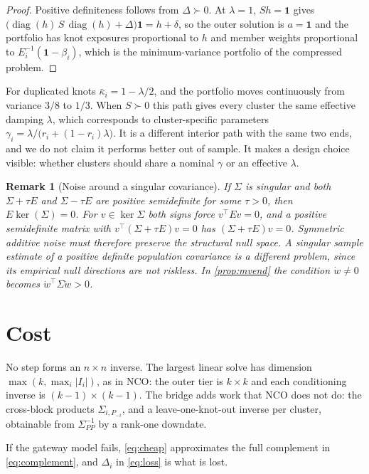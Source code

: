 \documentclass[11pt]{article}
\newcommand{\ones}{\mathbf{1}}
\newtheorem{remark}{Remark}
\begin{document}
\begin{proof}
Positive definiteness follows from $\Delta\succ0$. At $\lambda=1$,
$Sh=\ones$ gives
$\big(\operatorname{diag}(h)\,S\,\operatorname{diag}(h)+\Delta\big)\ones=h+\delta$,
so the outer solution is $a=\ones$ and the portfolio has knot exposures
proportional to $h$ and member weights proportional to $E_i^{-1}(\ones-\beta_i)$,
which is the minimum-variance portfolio of the compressed problem.
\end{proof}

For duplicated knots $\bar\kappa_i=1-\lambda/2$, and the portfolio moves
continuously from variance $3/8$ to $1/3$. When $S\succ0$ this path gives
every cluster the same effective damping $\lambda$, which corresponds to
cluster-specific parameters $\gamma_i=\lambda/\big(r_i+(1-r_i)\lambda\big)$.
It is a different interior path with the same two ends, and we do not claim
it performs better out of sample. It makes a design choice visible: whether
clusters should share a nominal $\gamma$ or an effective $\lambda$.

\begin{remark}[Noise around a singular covariance]
If $\Sigma$ is singular and both $\Sigma+\tau E$ and $\Sigma-\tau E$ are
positive semidefinite for some $\tau>0$, then $E\ker(\Sigma)=0$. For
$v\in\ker\Sigma$ both signs force $v^\top Ev=0$, and a positive semidefinite
matrix with $v^\top(\Sigma+\tau E)v=0$ has $(\Sigma+\tau E)v=0$. Symmetric
additive noise must therefore preserve the structural null space. A singular
sample estimate of a positive definite population covariance is a different
problem, since its empirical null directions are not riskless. In
\cref{prop:mvend} the condition $\dot w\neq0$ becomes
$\dot w^\top\Sigma\dot w>0$.
\end{remark}

\section{Cost}

No step forms an $n\times n$ inverse. The largest linear solve has dimension
$\max(k,\max_i|I_i|)$, as in NCO: the outer tier is $k\times k$ and each
conditioning inverse is $(k-1)\times(k-1)$. The bridge adds work that NCO
does not do: the cross-block products $\Sigma_{i,P_{-i}}$, and a
leave-one-knot-out inverse per cluster, obtainable from $\Sigma_{PP}^{-1}$
by a rank-one downdate.

If the gateway model fails, \eqref{eq:cheap} approximates the full
complement in \eqref{eq:complement}, and $\Delta_i$ in \eqref{eq:loss} is
what is lost.
\end{document}
